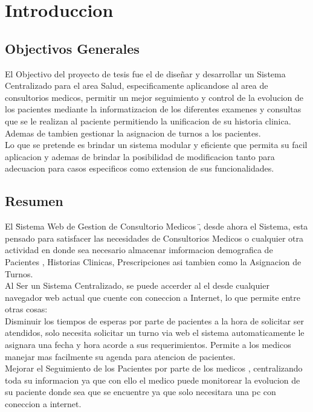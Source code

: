 \chapter{Introduccion}

\section{Objectivos Generales}


El Objectivo del proyecto de tesis fue el de diseñar y desarrollar un Sistema
Centralizado para el area Salud, especificamente aplicandose al area de
consultorios medicos, permitir un mejor seguimiento y control de la evolucion
de los pacientes mediante la informatizacion de los diferentes examenes y consultas
que se le realizan al paciente permitiendo la unificacion de su historia clinica.
Ademas de tambien gestionar la asignacion de turnos a los pacientes.\\[0.1cm]

Lo que se pretende es brindar un sistema modular y eficiente que permita su
facil aplicacion y ademas de brindar la posibilidad de modificacion tanto para
adecuacion para casos especificos como extension de sus funcionalidades.\\[0.1cm]

\section{Resumen}

El \" Sistema Web de Gestion de Consultorio Medicos \" , desde ahora el Sistema,
esta pensado para satisfacer las necesidades de Consultorios Medicos o cualquier
otra actividad en donde sea necesario almacenar imformacion demografica de Pacientes
, Historias Clinicas, Prescripciones asi tambien como la Asignacion de Turnos.\\[0.1cm]

Al Ser un Sistema Centralizado, se puede accerder al el desde cualquier navegador
web actual que cuente con coneccion a Internet, lo que permite entre otras cosas:\\[0.1cm]

Disminuir los tiempos de esperas por parte de pacientes a la hora de solicitar ser
atendidos, solo necesita solicitar un turno via web el sistema automaticamente
le asignara una fecha y hora acorde a sus requerimientos. Permite a los medicos
manejar mas facilmente su agenda para atencion de pacientes.\\[0.1cm]

Mejorar el Seguimiento de los Pacientes por parte de los medicos , centralizando
toda su informacion ya que con ello el medico puede monitorear la evolucion de
su paciente donde sea que se encuentre ya que solo necesitara una pc con coneccion
a internet.\\[0.1cm]







